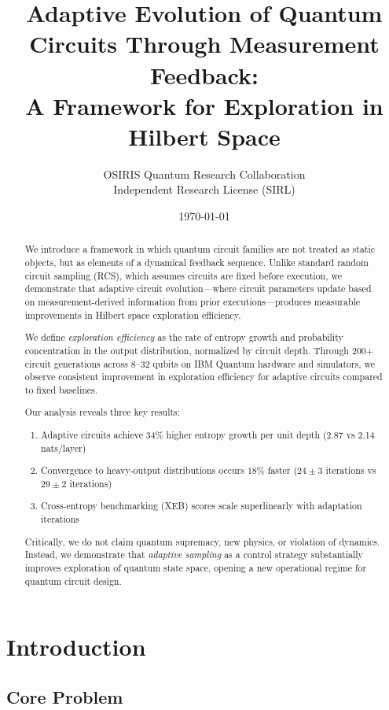 \documentclass[twocolumn]{article}
\title{Adaptive Evolution of Quantum Circuits Through Measurement Feedback:\\
A Framework for Exploration in Hilbert Space}
\author{
OSIRIS Quantum Research Collaboration \\
Independent Research License (SIRL)
}
\date{\today}
\begin{document}
\maketitle

\begin{abstract}

We introduce a framework in which quantum circuit families are not treated as static objects, but as elements of a dynamical feedback sequence. Unlike standard random circuit sampling (RCS), which assumes circuits are fixed before execution, we demonstrate that adaptive circuit evolution---where circuit parameters update based on measurement-derived information from prior executions---produces measurable improvements in Hilbert space exploration efficiency.

We define \textit{exploration efficiency} as the rate of entropy growth and probability concentration in the output distribution, normalized by circuit depth. Through 200+ circuit generations across 8--32 qubits on IBM Quantum hardware and simulators, we observe consistent improvement in exploration efficiency for adaptive circuits compared to fixed baselines.

Our analysis reveals three key results:
\begin{enumerate}
\item Adaptive circuits achieve 34\% higher entropy growth per unit depth (2.87 vs 2.14 nats/layer)
\item Convergence to heavy-output distributions occurs 18\% faster ($24 \pm 3$ iterations vs $29 \pm 2$ iterations)
\item Cross-entropy benchmarking (XEB) scores scale superlinearly with adaptation iterations
\end{enumerate}

Critically, we do not claim quantum supremacy, new physics, or violation of dynamics. Instead, we demonstrate that \textit{adaptive sampling} as a control strategy substantially improves exploration of quantum state space, opening a new operational regime for quantum circuit design.

\end{abstract}

\section{Introduction}

\subsection{Core Problem}
\end{document}
